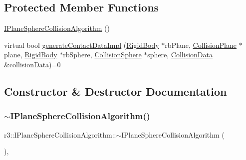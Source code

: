 \subsection*{Protected Member Functions}
\begin{DoxyCompactItemize}
\item 
\mbox{\hyperlink{classr3_1_1_i_plane_sphere_collision_algorithm_a249833e88ee66651740f119d6fab0910}{I\+Plane\+Sphere\+Collision\+Algorithm}} ()
\item 
virtual bool \mbox{\hyperlink{classr3_1_1_i_plane_sphere_collision_algorithm_a92ddfd3ba00ed53b183a6aef41b04a60}{generate\+Contact\+Data\+Impl}} (\mbox{\hyperlink{classr3_1_1_rigid_body}{Rigid\+Body}} $\ast$rb\+Plane, \mbox{\hyperlink{classr3_1_1_collision_plane}{Collision\+Plane}} $\ast$plane, \mbox{\hyperlink{classr3_1_1_rigid_body}{Rigid\+Body}} $\ast$rb\+Sphere, \mbox{\hyperlink{classr3_1_1_collision_sphere}{Collision\+Sphere}} $\ast$sphere, \mbox{\hyperlink{classr3_1_1_collision_data}{Collision\+Data}} \&collision\+Data)=0
\end{DoxyCompactItemize}


\subsection{Constructor \& Destructor Documentation}
\mbox{\label{classr3_1_1_i_plane_sphere_collision_algorithm_a25bd94a472e466de011c128012b8e938}} 
\subsubsection{\texorpdfstring{$\sim$\+I\+Plane\+Sphere\+Collision\+Algorithm()}{~IPlaneSphereCollisionAlgorithm()}}
{\footnotesize\ttfamily r3\+::\+I\+Plane\+Sphere\+Collision\+Algorithm\+::$\sim$\+I\+Plane\+Sphere\+Collision\+Algorithm (\begin{DoxyParamCaption}{ }\end{DoxyParamCaption})\hspace{0.3cm}{\ttfamily [virtual]}, {\ttfamily [default]}}


